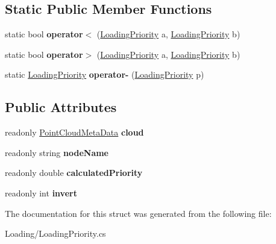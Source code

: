 \subsection*{Static Public Member Functions}
\begin{DoxyCompactItemize}
\item 
\mbox{\label{struct_loading_1_1_loading_priority_a1334e418137649e7ff008fe08eb41f3d}} 
static bool {\bfseries operator$<$} (\hyperlink{struct_loading_1_1_loading_priority}{Loading\+Priority} a, \hyperlink{struct_loading_1_1_loading_priority}{Loading\+Priority} b)
\item 
\mbox{\label{struct_loading_1_1_loading_priority_ab5fd0b00e75e50839a0d3ddfe115112c}} 
static bool {\bfseries operator$>$} (\hyperlink{struct_loading_1_1_loading_priority}{Loading\+Priority} a, \hyperlink{struct_loading_1_1_loading_priority}{Loading\+Priority} b)
\item 
\mbox{\label{struct_loading_1_1_loading_priority_a5edd56d05daf22b47d1d6375627f3487}} 
static \hyperlink{struct_loading_1_1_loading_priority}{Loading\+Priority} {\bfseries operator-\/} (\hyperlink{struct_loading_1_1_loading_priority}{Loading\+Priority} p)
\end{DoxyCompactItemize}
\subsection*{Public Attributes}
\begin{DoxyCompactItemize}
\item 
\mbox{\label{struct_loading_1_1_loading_priority_a27bfeb4785cc81c21b372bdcc5b9bb8e}} 
readonly \hyperlink{class_cloud_data_1_1_point_cloud_meta_data}{Point\+Cloud\+Meta\+Data} {\bfseries cloud}
\item 
\mbox{\label{struct_loading_1_1_loading_priority_ae0f94ed4d076a7c133d578a19de02734}} 
readonly string {\bfseries node\+Name}
\item 
\mbox{\label{struct_loading_1_1_loading_priority_a9bafe1ba3ebb9c10188b9cd5d0f09faf}} 
readonly double {\bfseries calculated\+Priority}
\item 
\mbox{\label{struct_loading_1_1_loading_priority_a3e1cca3f2f6b39cb1f213754a45f2541}} 
readonly int {\bfseries invert}
\end{DoxyCompactItemize}


The documentation for this struct was generated from the following file\+:\begin{DoxyCompactItemize}
\item 
Loading/Loading\+Priority.\+cs\end{DoxyCompactItemize}
